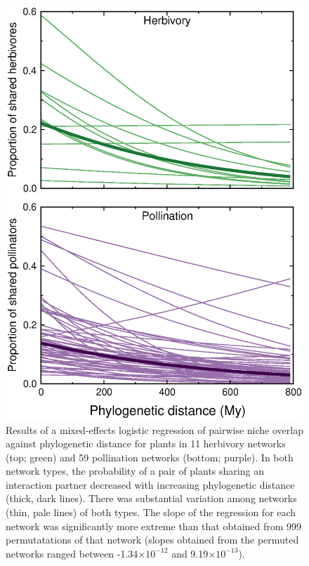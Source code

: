 \documentclass[12pt]{article}
\begin{document}
  \begin{figure}[!h]
    \begin{center}
      \centerline{\includegraphics*[width=.5\textwidth]{Figures/dataplots/scaled_regression_lines_full_color.eps}}
    \end{center}
     \caption{Results of a mixed-effects logistic regression of pairwise niche overlap
     against phylogenetic distance for plants in 11
     herbivory networks (top; green) and 59 pollination
     networks (bottom; purple). In both network types, the probability of a pair of plants
     sharing an interaction partner decreased with increasing phylogenetic distance (thick,
     dark lines). There was substantial variation among networks (thin, pale lines) of both types. The slope of the regression for each network was significantly more extreme than that obtained from 999 permutatations of that network (slopes obtained from the permuted networks ranged between -1.34$\times10^{-12}$ and 9.19$\times10^{-13}$).}
    \label{within_network_regression} 
  \end{figure}
\end{document}
